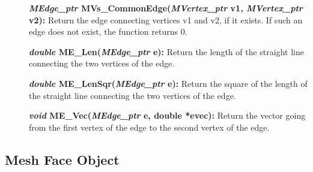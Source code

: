 \documentclass[12pt]{article}
\begin{document}
\begin{description}
\item[]\textbf{\textit{MEdge\_ptr} MVs\_CommonEdge(\textit{MVertex\_ptr} v1,
\textit{MVertex\_ptr} v2):} Return the edge connecting vertices v1 and
v2, if it exists. If such an edge does not exist, the function returns
0.

\item[]\textbf{\textit{double} ME\_Len(\textit{MEdge\_ptr} e):} Return
  the length of the straight line connecting the two vertices of the
  edge.

\item[]\textbf{\textit{double} ME\_LenSqr(\textit{MEdge\_ptr} e):}
  Return the square of the length of the straight line connecting the
  two vertices of the edge.

\item[]\textbf{\textit{void} ME\_Vec(\textit{MEdge\_ptr} e, double *evec):}
Return the vector going from the first vertex of the edge to the
second vertex of the edge.
\end{description}



\newpage
\subsection{Mesh Face Object}
\end{document}
